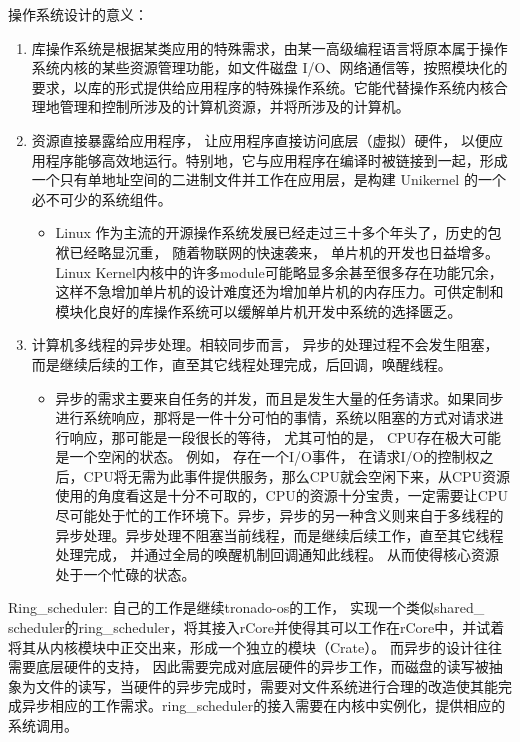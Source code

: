 操作系统设计的意义：
\begin{enumerate}
\item 库操作系统是根据某类应用的特殊需求，由某一高级编程语言将原本属于操作系统内核的某些资源管理功能，如文件磁盘 I/O、网络通信等，按照模块化的要求，以库的形式提供给应用程序的特殊操作系统。它能代替操作系统内核合理地管理和控制所涉及的计算机资源，并将所涉及的计算机。
\item 资源直接暴露给应用程序， 让应用程序直接访问底层（虚拟）硬件， 以便应用程序能够高效地运行。特别地，它与应用程序在编译时被链接到一起，形成一个只有单地址空间的二进制文件并工作在应用层，是构建 Unikernel 的一个必不可少的系统组件。
    \begin{itemize}
        \item Linux 作为主流的开源操作系统发展已经走过三十多个年头了，历史的包袱已经略显沉重， 随着物联网的快速袭来， 单片机的开发也日益增多。 Linux Kernel内核中的许多module可能略显多余甚至很多存在功能冗余， 这样不急增加单片机的设计难度还为增加单片机的内存压力。可供定制和模块化良好的库操作系统可以缓解单片机开发中系统的选择匮乏。
    \end{itemize}
\item 计算机多线程的异步处理。相较同步而言， 异步的处理过程不会发生阻塞，而是继续后续的工作，直至其它线程处理完成，后回调，唤醒线程。
    \begin{itemize}
    \item 异步的需求主要来自任务的并发，而且是发生大量的任务请求。如果同步进行系统响应，那将是一件十分可怕的事情，系统以阻塞的方式对请求进行响应，那可能是一段很长的等待， 尤其可怕的是， CPU存在极大可能是一个空闲的状态。 例如， 存在一个I/O事件， 在请求I/O的控制权之后，CPU将无需为此事件提供服务，那么CPU就会空闲下来，从CPU资源使用的角度看这是十分不可取的，CPU的资源十分宝贵，一定需要让CPU尽可能处于忙的工作环境下。异步，异步的另一种含义则来自于多线程的异步处理。异步处理不阻塞当前线程，而是继续后续工作，直至其它线程处理完成， 并通过全局的唤醒机制回调通知此线程。 从而使得核心资源处于一个忙碌的状态。
    \end{itemize}
\end{enumerate}

Ring\_scheduler: 自己的工作是继续tronado-os的工作， 实现一个类似shared\_ scheduler的ring\_scheduler，将其接入rCore并使得其可以工作在rCore中，并试着将其从内核模块中正交出来，形成一个独立的模块（Crate）。 而异步的设计往往需要底层硬件的支持， 因此需要完成对底层硬件的异步工作，而磁盘的读写被抽象为文件的读写，当硬件的异步完成时，需要对文件系统进行合理的改造使其能完成异步相应的工作需求。ring\_scheduler的接入需要在内核中实例化，提供相应的系统调用。

